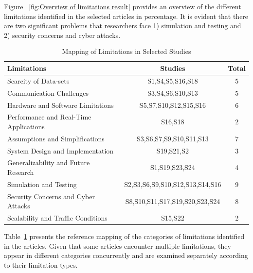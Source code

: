 \documentclass[a4paper,12pt]{article}
\begin{document}
Figure ~\ref{fig:Overview of limitations result} provides an overview of the different limitations identified in the selected articles in percentage. It is evident that there are two significant problems that researchers face 1) simulation and testing and 2) security concerns and cyber attacks. \par

\begin{table}[H]
\centering
\caption{Mapping of Limitations in Selected Studies}
\label{tab:limitation_mapping}
\begin{tabularx}{\textwidth}{|X|c|c|}
\hline
\rowcolor[HTML]{00D2CB} 
\textbf{Limitations} & \textbf{Studies} & \textbf{Total} \\
\hline
Scarcity of Data-sets & S1,S4,S5,S16,S18 &  5 \\
\hline
Communication Challenges & S3,S4,S6,S10,S13 & 5    \\
\hline
Hardware and Software Limitations & S5,S7,S10,S12,S15,S16 & 6   \\
\hline
Performance and Real-Time Applications & S16,S18 & 2  \\
\hline
Assumptions and Simplifications & S3,S6,S7,S9,S10,S11,S13 & 7   \\
\hline
System Design and Implementation & S19,S21,S2 & 3    \\
\hline
Generalizability and Future Research & S1,S19,S23,S24 & 4   \\
\hline
Simulation and Testing & S2,S3,S6,S9,S10,S12,S13,S14,S16 & 9    \\
\hline
Security Concerns and Cyber Attacks & S8,S10,S11,S17,S19,S20,S23,S24 & 8    \\
\hline
Scalability and Traffic Conditions & S15,S22 & 2   \\
\hline
\end{tabularx}
\end{table}

\hspace{5mm} Table~\ref{tab:limitation_mapping} presents the reference mapping of the categories of limitations identified in the articles. Given that some articles encounter multiple limitations, they appear in different categories concurrently and are examined separately according to their limitation types.
\end{document}

